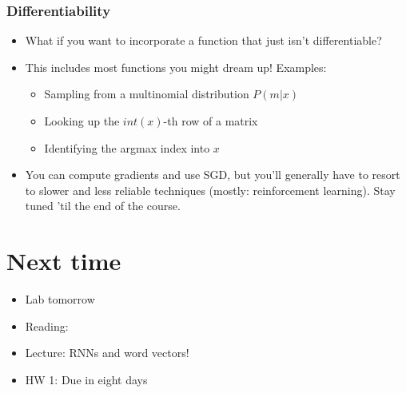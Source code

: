 \documentclass{beamer}
\begin{document}
\begin{frame}
\frametitle{Differentiability}

\begin{itemize}
\item What if you want to incorporate a function that just isn't differentiable?
\item This includes most functions you might dream up! Examples:
\begin{itemize}
\item Sampling from a multinomial distribution $P(m|x)$
\item Looking up the $int(x)$-th row of a matrix
\item Identifying the argmax index into $x$
\end{itemize}
\item You can compute gradients and use SGD, but you'll generally have to resort to slower and less reliable techniques (mostly: reinforcement learning). Stay tuned 'til the end of the course.
\end{itemize}

\end{frame}

\section{Next time}

\begin{frame}
\begin{itemize}
\item Lab tomorrow
\item Reading: 
\item Lecture: RNNs and word vectors!
\item HW 1: Due in eight days
\end{itemize}
\end{frame}


\end{document}
